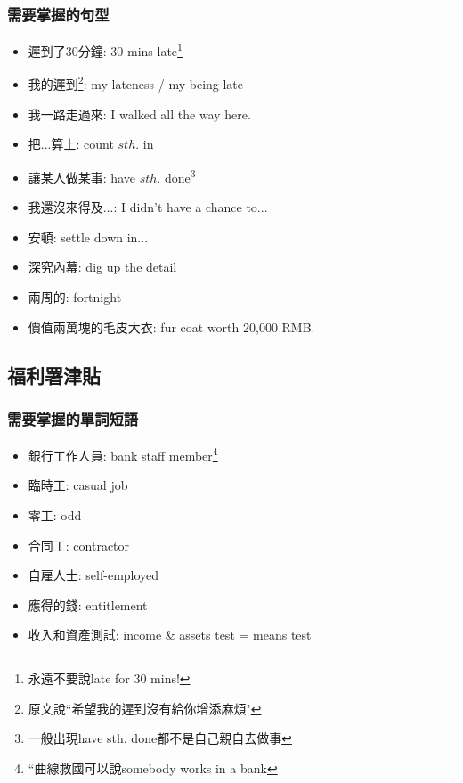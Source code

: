 \subsubsection*{需要掌握的句型}
\begin{multicols}{2}
\begin{itemize}
  \itemsep0em
  \item 遲到了30分鐘: 30 mins late\footnote{永遠不要說late for 30 mins!}
  \item 我的遲到\footnote{原文說``希望我的遲到沒有給你增添麻煩"}: my lateness / my being late
  \item 我一路走過來: I walked all the way here.
  \item 把...算上: count $sth.$ in
  \item 讓某人做某事: have $sth.$ done\footnote{一般出現have sth. done都不是自己親自去做事}
  \item 我還沒來得及...: I didn't have a chance to...
  \item 安頓: settle down in...
  \item 深究內幕: dig up the detail
  \item 兩周的: fortnight
  \item 價值兩萬塊的毛皮大衣: fur coat worth 20,000 RMB.
\end{itemize}
\end{multicols}

\subsection{福利署津貼}
\subsubsection*{需要掌握的單詞短語}
\begin{multicols}{2}
\begin{itemize}
  \itemsep0em
  \item 銀行工作人員: bank staff member\footnote{``曲線救國可以說somebody works in a bank}
  \item 臨時工: casual job
  \item 零工: odd
  \item 合同工: contractor
  \item 自雇人士: self-employed
  \item 應得的錢: entitlement
  \item 收入和資產測試: income \& assets test = means test
\end{itemize}
\end{multicols}

